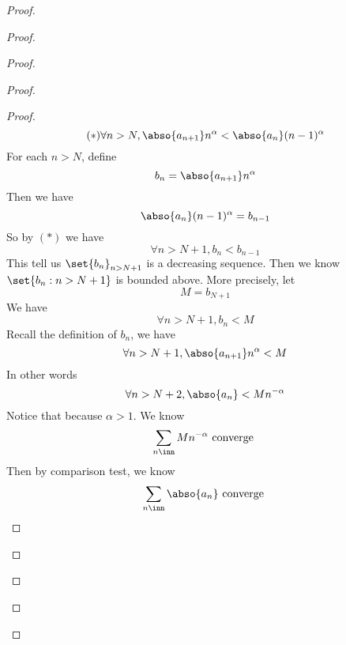 \documentclass{report}
\begin{document}
\begin{proof}
\begin{proof}
\begin{proof}
\begin{proof}
\begin{proof}
\begin{equation*}
  (*)\forall n>N, \abso{a_{n+1}}n^\alpha < \abso{a_n} (n-1)^{\alpha }
\end{equation*}
For each $n>N$, define
 \begin{equation*}
b_n=\abso{a_{n+1}}n^{\alpha }
\end{equation*}
Then we have
\begin{equation*}
\abso{a_n}(n-1)^{\alpha }=b_{n-1}
\end{equation*}
So by $(*)$ we have
\begin{equation*}
\forall n>N+1, b_n<b_{n-1}
\end{equation*}
This tell us $\set{b_n}_{n>N+1}$ is a decreasing sequence. Then we know $\set{b_n:n>N+1}$ is bounded above. More precisely, let
\begin{equation*}
M=b_{N+1}
\end{equation*}
We have
\begin{equation*}
\forall n>N+1, b_n< M
\end{equation*}
Recall the definition of $b_n$, we have
 \begin{equation*}
\forall n>N+1, \abso{a_{n+1}}n^{\alpha }<M
\end{equation*}
In other words
\begin{equation*}
\forall n>N+2, \abso{a_n}<Mn^{-\alpha }
\end{equation*}
Notice that because $\alpha>1 $. We know 
\begin{equation*}
\sum_{n\inn} Mn^{-\alpha }\text{ converge }
\end{equation*}
Then by comparison test, we know
\begin{equation*}
\sum_{n\inn} \abso{a_n}\text{ converge }
\end{equation*}

\end{proof}


\end{proof}
\end{proof}
\end{proof}
\end{proof}
\end{document}
